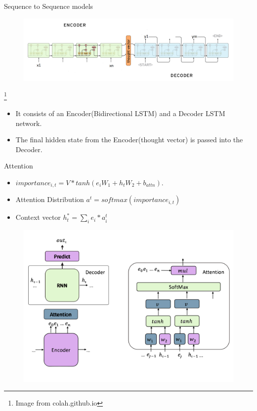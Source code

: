 \documentclass{beamer}
\begin{document}
\begin{frame}{Sequence to Sequence models}

\begin{figure}
        \includegraphics[width=1.0\linewidth]{seq2seq2.png}
    \end{figure}
    \footnote{Image from colah.github.io}
\begin{itemize}
    \item It consists of an Encoder(Bidirectional LSTM) and a Decoder LSTM network.
    \item The final hidden state from the Encoder(thought vector) is passed into the Decoder.
\end{itemize}
\end{frame}

\begin{frame}{Attention}
	\begin{itemize}   
        \item $importance_{i,t} = V* tanh(e_iW_1+h_tW_2+b_{attn})$.
        \item Attention Distribution $a^t = softmax(importance_{i,t})$
        \item  Context vector $ h^{*}_t = \sum_i e_i*a^t_i$
    \end{itemize}
    \begin{figure}
            \includegraphics[width=0.7\linewidth]{7.pdf}
    \end{figure}
\end{frame}
\end{document}
